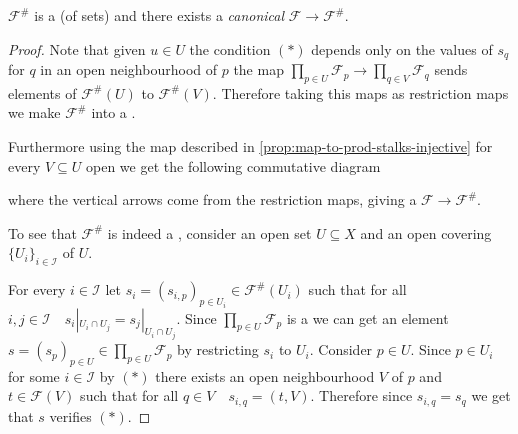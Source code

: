 \documentclass[../main.tex]{subfiles}
\begin{document}
\begin{lemma}
  \(\mathcal{F}^{\#}\) is a  (of sets) and there exists a \textit{canonical}  \(\mathcal{F} \to \mathcal{F}^{\#}\).
\end{lemma}
\begin{proof}
  Note that given \(u \in U\) the condition \((\ast)\) depends only on the values of \(s_{q}\) for \(q\) in an open neighbourhood of \(p\) the map \(\prod_{p \in U} \mathcal{F}_{p} \to \prod_{q \in V} \mathcal{F}_{q}\) sends elements of \(\mathcal{F}^{\#}(U)\) to \(\mathcal{F}^{\#}(V)\).
  Therefore taking this maps as restriction maps we make \(\mathcal{F}^{\#}\) into a .

  Furthermore using the map described in \autoref{prop:map-to-prod-stalks-injective} for every \(V \subseteq U\) open we get the following commutative diagram
  \begin{center}
  \end{center}
  where the vertical arrows come from the restriction maps, giving a  \(\mathcal{F} \to \mathcal{F}^{\#}\).

  To see that \(\mathcal{F}^{\#}\) is indeed a , consider an open set \(U \subseteq X\) and an open covering \(\{U_{i}\}_{i \in \mathcal{I}}\) of \(U\).

  For every \(i \in \mathcal{I}\) let \(s_{i} = (s_{i, p})_{p \in U_{i}} \in \mathcal{F}^{\#}(U_{i})\) such that for all \(i, j \in \mathcal{I} \quad s_{i}|_{U_{i} \cap U_{j}} = s_{j}|_{U_{i} \cap U_{j}}\).
  Since \(\prod_{p \in U} \mathcal{F}_{p}\) is a  we can get an element \(s = (s_{p})_{p \in U} \in \prod_{p \in U} \mathcal{F}_{p}\) by restricting \(s_{i}\) to \(U_{i}\).
  Consider \(p \in U\). Since \(p \in U_{i}\) for some \(i \in \mathcal{I}\) by \((\ast)\) there exists an open neighbourhood \(V\) of \(p\) and \(t \in \mathcal{F}(V)\) such that for all \(q \in V \quad s_{i, q} = (t, V)\).
  Therefore since \(s_{i, q} = s_{q}\) we get that \(s\) verifies \((\ast)\).
\end{proof}
\end{document}
